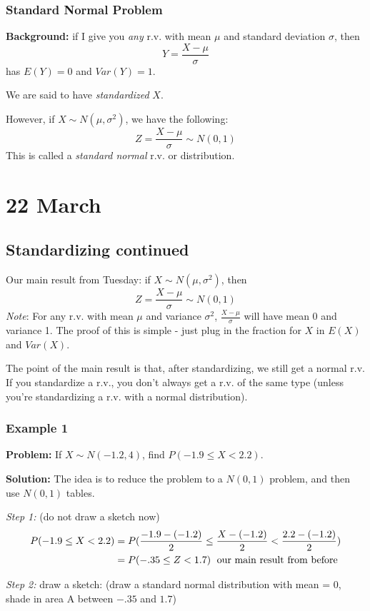 \documentclass[12pt]{article}
\begin{document}
\subsubsection{Standard Normal Problem}
\textbf{Background:} if I give you \emph{any} r.v. with mean $\mu$ and standard deviation $\sigma$, then 
\[
    Y = \frac{X - \mu}{\sigma}
\]
has $E(Y) = 0$ and $Var(Y) = 1$. 

We are said to have \emph{standardized} $X$.

However, if $X \sim N(\mu, \sigma^2)$, we have the following:
\[
    Z = \frac{X - \mu}{\sigma} \sim N(0,1)
\]
This is called a \emph{standard normal} r.v. or distribution. 

\section{22 March}
\subsection{Standardizing continued}
Our main result from Tuesday: if $X \sim N(\mu, \sigma^2)$, then
\[
    Z = \frac{X - \mu}{\sigma} \sim N(0,1)
\]
\emph{Note}: For any r.v. with mean $\mu$ and variance $\sigma^2$, $\frac{X-\mu}{\sigma}$ will have mean 0 and variance 1. The proof of this is simple - just plug in the fraction for $X$ in $E(X)$ and $Var(X)$.

The point of the main result is that, after standardizing, we still get a normal r.v. If you standardize a r.v., you don't always get a r.v. of the same type (unless you're standardizing a r.v. with a normal distribution).

\subsubsection{Example 1}
\textbf{Problem:} If $X \sim N(-1.2, 4)$, find $P(-1.9 \leq X < 2.2)$.

\textbf{Solution:} The idea is to reduce the problem to a $N(0,1)$ problem, and then use $N(0,1)$ tables. 

\emph{Step 1:} (do not draw a sketch now)
\begin{align*}
    P(-1.9 \leq X < 2.2) &= P( \frac{-1.9-(-1.2)}{2} \leq \frac{X - (-1.2)}{2} < \frac{2.2-(-1.2)}{2}) \\
        &=  P(-.35 \leq Z < 1.7) \; \textnormal{ our main result from before }
\end{align*}

\emph{Step 2:} draw a sketch: (draw a standard normal distribution with mean = 0, shade in area A between $-.35$ and $1.7$)
\end{document}

